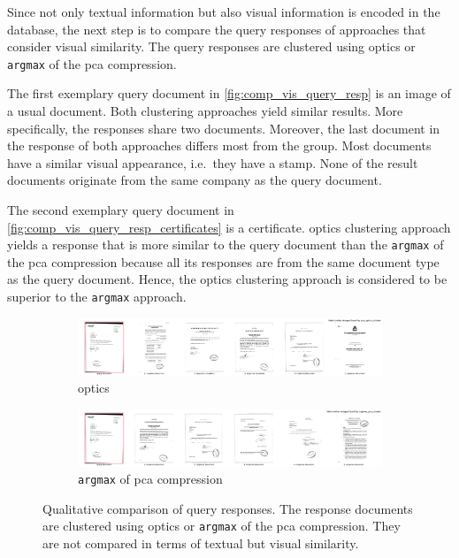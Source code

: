 Since not only textual information but also visual information is encoded in the database, 
the next step is to compare the query responses of approaches that consider visual similarity.
The query responses are clustered using \ac{optics} or \texttt{argmax} of the \ac{pca} compression.

The first exemplary query document in \autoref{fig:comp_vis_query_resp} is an image of a usual document.
Both clustering approaches yield similar results.
More specifically, the responses share two documents.
Moreover, the last document in the response of both approaches differs most from the group.
Most documents have a similar visual appearance, i.e.\ they have a stamp.
None of the result documents originate from the same company as the query document.

The second exemplary query document in \autoref{fig:comp_vis_query_resp_certificates} is a certificate.
\ac{optics} clustering approach yields a response that is more similar to the query document than the \texttt{argmax} of the \ac{pca} compression
because all its responses are from the same document type as the query document.
Hence, the \ac{optics} clustering approach is considered to be superior to the \texttt{argmax} approach.

\begin{figure}[h!]
    \begin{subfigure}{\textwidth}
        \centering
        \includegraphics[width=1\textwidth]{images/query_results/d5b16dcfc7c090c1c0ea7503d3fce417a84aa429a078478fdb4291805fee1328/Most_similar_images_found_by_pca_optics_cluster.pdf}
        \caption{\ac{optics}}
    \end{subfigure}

    \begin{subfigure}{\textwidth}
        \centering
        \includegraphics[width=1\textwidth]{images/query_results/d5b16dcfc7c090c1c0ea7503d3fce417a84aa429a078478fdb4291805fee1328/Most_similar_images_found_by_argmax_pca_cluster.pdf}
        \caption{\texttt{argmax} of \ac{pca} compression}
    \end{subfigure}

\caption[Qualitative comparison of clustering on visual information]{Qualitative comparison of query responses.
The response documents are clustered using \ac{optics} or \texttt{argmax} of the \ac{pca} compression.
They are not compared in terms of textual but visual similarity.
}
\label{fig:comp_vis_query_resp}
\end{figure}

